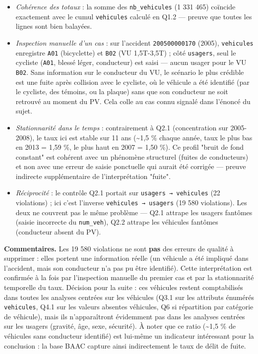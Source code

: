 \documentclass[11pt,a4paper]{article}
\newcommand{\rub}[2]{\textbf{\textcolor{#1}{#2}}}
\begin{document}
\begin{itemize}
\item \emph{Cohérence des totaux} : la somme des \texttt{nb\_vehicules} (1 331 465) coïncide exactement avec le cumul \texttt{vehicules} calculé en Q1.2 — preuve que toutes les lignes sont bien balayées.
\item \emph{Inspection manuelle d'un cas} : sur l'accident \texttt{200500000170} (2005), \texttt{vehicules} enregistre \texttt{A01} (bicyclette) et \texttt{B02} (VU 1,5T-3,5T) ; côté \texttt{usagers}, seul le cycliste (\texttt{A01}, blessé léger, conducteur) est saisi — aucun usager pour le VU \texttt{B02}. Sans information sur le conducteur du VU, le scénario le plus crédible est une fuite après collision avec le cycliste, où le véhicule a été identifié (par le cycliste, des témoins, ou la plaque) sans que son conducteur ne soit retrouvé au moment du PV. Cela colle au cas connu signalé dans l'énoncé du sujet.
\item \emph{Stationnarité dans le temps} : contrairement à Q2.1 (concentration sur 2005-2008), le taux ici est stable sur 11 ans (\textasciitilde{}1,5 \% chaque année, taux le plus bas en 2013 = 1,59 \%, le plus haut en 2007 = 1,50 \%). Ce profil "bruit de fond constant" est cohérent avec un phénomène structurel (fuites de conducteurs) et non avec une erreur de saisie ponctuelle qui aurait été corrigée — preuve indirecte supplémentaire de l'interprétation "fuite".
\item \emph{Réciprocité} : le contrôle Q2.1 portait sur \texttt{usagers → vehicules} (22 violations) ; ici c'est l'inverse \texttt{vehicules → usagers} (19 580 violations). Les deux ne couvrent pas le même problème — Q2.1 attrape les usagers fantômes (saisie incorrecte du \texttt{num\_veh}), Q2.2 attrape les véhicules fantômes (conducteur absent du PV).
\end{itemize}

\rub{labcomment}{Commentaires.} Les 19 580 violations ne sont \textbf{pas} des erreurs de qualité à supprimer : elles portent une information réelle (un véhicule a été impliqué dans l'accident, mais son conducteur n'a pas pu être identifié). Cette interprétation est confirmée à la fois par l'inspection manuelle du premier cas et par la stationnarité temporelle du taux. Décision pour la suite : ces véhicules restent comptabilisés dans toutes les analyses centrées sur les véhicules (Q3.1 sur les attributs énumérés \texttt{vehicules}, Q4.1 sur les valeurs absentes véhicules, Q6 si répartition par catégorie de véhicule), mais ils n'apparaîtront évidemment pas dans les analyses centrées sur les usagers (gravité, âge, sexe, sécurité). À noter que ce ratio (\textasciitilde{}1,5 \% de véhicules sans conducteur identifié) est lui-même un indicateur intéressant pour la conclusion : la base BAAC capture ainsi indirectement le taux de délit de fuite.
\end{document}
